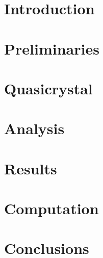 \documentclass[a4paper,10pt,twoside]{report}
\theoremstyle{remark}
\begin{document}
\clearpage
\thispagestyle{empty}
\cleardoublepage
\thispagestyle{empty}

\tableofcontents


\chapter*{Introduction}


\cleardoublepage
\chapter{Preliminaries}

%
\clearpage
\chapter{Quasicrystal}


\clearpage
\chapter{Analysis}

\pagebreak


\clearpage
\chapter{Results}\label{cha_results}

\clearpage

\clearpage



\clearpage
\chapter{Computation}\label{cha_computation}


\chapter*{Conclusions}



\end{document}
